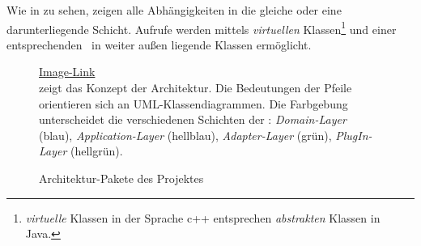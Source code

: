 



Wie in  zu sehen, zeigen alle Abhängigkeiten in die gleiche oder eine darunterliegende Schicht. Aufrufe werden mittels \textit{virtuellen} Klassen\footnote{\textit{virtuelle} Klassen in der Sprache c++ entsprechen \textit{abstrakten} Klassen in Java.} und einer entsprechenden \DepInv\ in weiter außen liegende Klassen ermöglicht.


\begin{figure}[ht!]
\vspace{0.25cm}
\begin{center}
\caption{Architektur-Pakete des Projektes}
\label{fig:ArchPkg}
\end{center}

\vspace{0.25cm}
\href{https://github.com/MaagMich/SWE2\_Project/blob/c5c3674bd201ee306463881cf711bb2ce9229842/Ausarbeitung/Pictures/Architecture\%20Blocks.png}{Image-Link}\\
 zeigt das Konzept der Architektur. Die Bedeutungen der Pfeile orientieren sich an UML-Klassendiagrammen. Die Farbgebung unterscheidet die verschiedenen Schichten der \clean: \textit{Domain-Layer} (blau), \textit{Application-Layer} (hellblau), \textit{Adapter-Layer} (grün), \textit{PlugIn-Layer} (hellgrün).
\end{figure}



